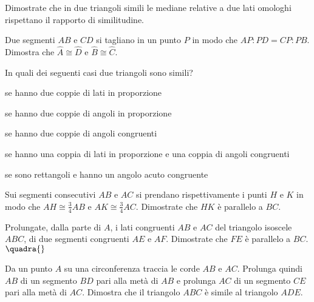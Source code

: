 \begin{multicols}{2}
\begin{esercizio}
\label{ese:6.74}
Dimostrate che in due triangoli simili le mediane relative a due lati 
omologhi rispettano il rapporto di similitudine.
\end{esercizio}

\begin{esercizio}
\label{ese:6.75}
Due segmenti \(AB\) e \(CD\) si tagliano in un punto \(P\) in modo che 
\(AP:PD=CP:PB\). Dimostra che \(\widehat{A}\cong \widehat{D}\) e 
\(\widehat{B}\cong \widehat{C}\).
\end{esercizio}

\begin{esercizio}
\label{ese:6.80}
In quali dei seguenti casi due triangoli sono simili?
\begin{enumeratea}
\item se hanno due coppie di lati in 
proporzione\tab\hfill\boxV\quad\boxF
\item se hanno due coppie di angoli in 
proporzione\tab\hfill\boxV\quad\boxF
\item se hanno due coppie di angoli 
congruenti\tab\hfill\boxV\quad\boxF
\item se hanno una coppia di lati in proporzione e una coppia di 
angoli congruenti\tab\hfill\boxV\quad\boxF
\item se sono rettangoli e hanno un angolo acuto 
congruente\hfill\boxV\quad\boxF
\end{enumeratea}
\end{esercizio}

\begin{esercizio}
\label{ese:6.76}
Sui segmenti consecutivi \(AB\) e \(AC\) si prendano rispettivamente i 
punti \(H\) e \(K\) in modo che \(AH\cong \frac{3}{4}AB\) e \(AK\cong 
\frac{3}{4}AC\). Dimostrate che \(HK\) è parallelo a \(BC\).
\end{esercizio}

\begin{esercizio}
\label{ese:6.77}
Prolungate, dalla parte di \(A\), i lati congruenti \(AB\) e \(AC\) del 
triangolo isoscele \(ABC\), di due segmenti congruenti \(AE\) e \(AF\). 
Dimostrate che \(FE\) è parallelo a \(BC\).
\hfill\(\quadra{}\)
\end{esercizio}

\begin{esercizio}
\label{ese:6.78}
Da un punto \(A\) su una circonferenza traccia le corde \(AB\) e \(AC\). 
Prolunga quindi \(AB\) di un segmento \(BD\) pari alla metà di \(AB\) e 
prolunga \(AC\) di un segmento \(CE\) pari alla metà di \(AC\). Dimostra 
che il triangolo \(ABC\) è simile al triangolo \(ADE\).
\end{esercizio}


\end{multicols}
